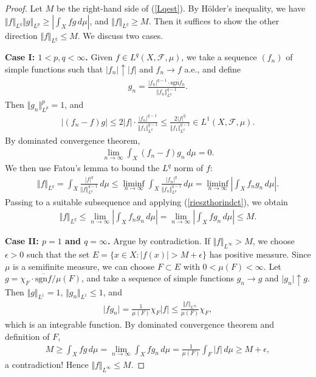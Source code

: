 \documentclass{article}
\numberwithin{equation}{section}
\newcommand{\scr}{\mathscr}
\newcommand{\ol}{\overline}
\theoremstyle{plain}
\theoremstyle{definition}
\begin{document}
\begin{proof} Let $M$ be the right-hand side of (\ref{Lqest}). By Hölder's inequality, we have $\Vert f\Vert_{L^q}\Vert g\Vert_{L^p}\geq\left\vert\int_X fg\,d\mu\right\vert$, and $\Vert f\Vert_{L^q}\geq M$. Then it suffices to show the other direction $\Vert f\Vert_{L^q}\leq M$. We discuss two cases.
\item\textbf{Case I: $1<p,q<\infty$.} Given $f\in L^q(X,\scr{F},\mu)$, we take a sequence $(f_n)$ of simple functions such that $\vert f_n\vert\uparrow\vert f\vert$ and $f_n\to f$ a.e., and define
\begin{align*}
	g_n=\frac{\vert f_n\vert^{q-1}\cdot\ol{\mathrm{sgn}f_n}}{\Vert f_n\Vert_{L^q}^{q-1}}.
\end{align*}
Then $\Vert g_n\Vert_{L^p}^p=1$, and
\begin{align*}
	\vert(f_n-f)g\vert\leq 2\vert f\vert\cdot\frac{\vert f_n\vert^{q-1}}{\Vert f_1\Vert_{L^q}^{q-1}}\leq \frac{2\vert f\vert^q}{\Vert f_1\Vert_{L^q}^{q-1}}\in L^1(X,\scr{F},\mu).
\end{align*}
By dominated convergence theorem,
\begin{align*}
	\lim_{n\to\infty}\int_X (f_n-f)g_n\,d\mu=0.\label{rieszthorindct}
\end{align*}
We then use Fatou's lemma to bound the $L^q$ norm of $f$:
\begin{align}
	\Vert f\Vert_{L^q}=\int_X\frac{\vert f\vert^q}{\Vert f\Vert_{L^q}^{q-1}}\,d\mu\leq\liminf_{n\to\infty}\int_X \frac{\vert f_n\vert^q}{\Vert f_n\Vert_{L^q}^{q-1}}\,d\mu=\liminf_{n\to\infty}\left\vert\int_X f_ng_n\,d\mu\right\vert.
\end{align}
Passing to a suitable subsequence and applying (\ref{rieszthorindct}), we obtain
\begin{align*}
	\Vert f\Vert_{L^q}\leq\lim_{n\to\infty}\left\vert\int_X f_ng_n\,d\mu\right\vert=\lim_{n\to\infty}\left\vert\int_X fg_n\,d\mu\right\vert\leq M.
\end{align*}
\item\textbf{Case II: $p=1$ and $q=\infty$.} Argue by contradiction. If $\Vert f\Vert_{L^\infty}>M$, we choose $\epsilon>0$ such that the set $E=\{x\in X:\vert f(x)\vert>M+\epsilon\}$ has positive measure. Since $\mu$ is a semifinite measure, we can choose $F\subset E$ with $0<\mu(F)<\infty$. Let $g=\chi_F\cdot\ol{\mathrm{sgn}f}/\mu(F)$, and take a sequence of simple functions $g_n\to g$ and $\vert g_n\vert\uparrow g$. Then $\Vert g\Vert_{L^1}=1$, $\Vert g_n\Vert_{L^1}\leq 1$, and
\begin{align*}
	\vert fg_n\vert =\frac{1}{\mu(F)}\chi_F\vert f\vert\leq\frac{\Vert f\Vert_{L^\infty}}{\mu(F)}\chi_F,
\end{align*} 
which is an integrable function. By dominated convergence theorem and definition of $F$,
\begin{align*}
	M\geq \int_X fg\,d\mu=\lim_{n\to\infty}\int_X fg_n\,d\mu=\frac{1}{\mu(F)}\int_F\vert f\vert\,d\mu\geq M+\epsilon,
\end{align*}
a contradiction! Hence $\Vert f\Vert_{L^\infty}\leq M$.
\end{proof}
\end{document}
